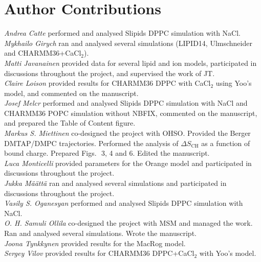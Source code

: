 \documentclass[twoside,twocolumn,9pt]{article}
\begin{document}
\section{Author Contributions}
\noindent 
{\it Andrea Catte} performed and analysed Slipids DPPC simulation with NaCl. \\
{\it Mykhailo Girych} ran and analysed several simulations (LIPID14, Ulmschneider and CHARMM36+CaCl$_2$). \\
{\it Matti Javanainen} provided data for several lipid and ion models, participated in discussions throughout the project, and supervised the work of JT. \\
{\it Claire Loison} provided results for CHARMM36 DPPC with CaCl$_{2}$ using Yoo's model, and commented on the manuscript. \\
{\it Josef Melcr} performed and analysed Slipids DPPC simulation with NaCl and CHARMM36 POPC simulation without NBFIX, commented on the manuscript, and prepared the Table of Content figure. \\
{\it Markus S. Miettinen} co-designed the project with OHSO.  Provided the Berger DMTAP/DMPC trajectories. Performed the analysis of $\Delta S_\mathrm{CH}$ as a function of bound charge. Prepared Figs.~\,3, 4 and 6. Edited the manuscript. \\
{\it Luca Monticelli} provided parameters for the Orange model and participated in discussions throughout the project. \\
{\it Jukka M{\"a}{\"a}tt{\"a}} ran and analysed several simulations and participated in discussions throughout the project. \\
{\it Vasily S. Oganesyan} performed and analysed Slipids DPPC simulation with NaCl.\\
{\it O. H. Samuli Ollila} co-designed the project with MSM and managed the work. Ran and analysed several simulations. Wrote the manuscript. \\
{\it Joona Tynkkynen } provided results for the MacRog model. \\
{\it Sergey Vilov} provided results for CHARMM36 DPPC+CaCl$_{2}$ with Yoo's model. \\


\end{document}
